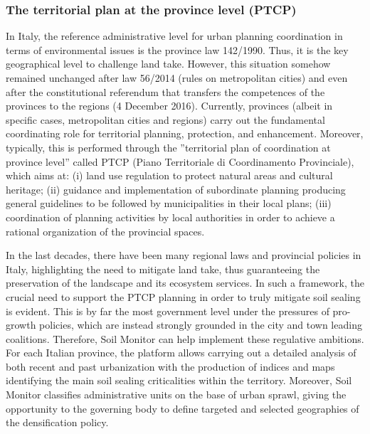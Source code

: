 \documentclass[APA,LATO1COL,doublespace]{WileyNJD-v2}
\newcommand{\toberevised}[1]{\emph{\textcolor{red}{#1}}} %
\begin{document}
\subsubsection{The territorial plan at the province level (PTCP)} %
\label{sec:casePROV}
In Italy, the reference administrative level for urban planning coordination in terms of environmental issues is the province law 142/1990. 
Thus, it is the key geographical level to challenge land take. 
However, this situation somehow remained unchanged after law 56/2014 (rules on metropolitan cities) and even after the constitutional referendum that transfers the competences of the provinces to the regions (4 December 2016).
Currently, provinces (albeit in specific cases, metropolitan cities and regions) carry out the fundamental coordinating role for territorial planning, protection, and enhancement. 
Moreover, typically, this is performed through the ''territorial plan of coordination at province level'' called PTCP (Piano Territoriale di Coordinamento Provinciale), which aims at: (i) land use regulation to protect natural areas and cultural heritage; (ii) guidance and implementation of subordinate planning producing general guidelines to be followed by municipalities in their local plans; (iii) coordination of planning activities by local authorities in order to achieve a rational organization of the provincial spaces.

In the last decades, there have been many regional laws and provincial policies in Italy, highlighting the need to mitigate land take, thus guaranteeing the preservation of the landscape and its ecosystem services. 
In such a framework, the crucial need to support the PTCP planning in order to truly mitigate soil sealing is evident. 
This is by far the most government level under the pressures of pro-growth policies, which are instead strongly grounded in the city and town leading coalitions.
Therefore, Soil Monitor can help implement these regulative ambitions.
For each Italian province, the platform allows carrying out a detailed analysis of both recent and past urbanization with the production of indices and maps identifying the main soil sealing criticalities within the territory.
Moreover, Soil Monitor classifies administrative units on the base of urban sprawl, giving the opportunity to the governing body to define targeted and selected geographies of the densification policy.
\end{document}
